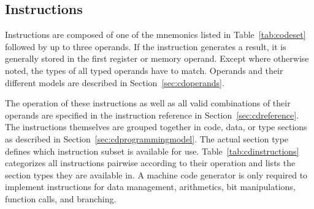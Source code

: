 \subsection{Instructions}

Instructions are composed of one of the mnemonics listed in Table~\ref{tab:codeset} followed by up to three operands.
If the instruction generates a result, it is generally stored in the first register or memory operand.
Except where otherwise noted, the types of all typed operands have to match.
Operands and their different models are described in Section~\ref{sec:cdoperands}.


The operation of these instructions as well as all valid combinations of their operands are specified in the instruction reference in Section~\ref{sec:cdreference}.
The instructions themselves are grouped together in code, data, or type sections as described in Section~\ref{sec:cdprogrammingmodel}.
The actual section type defines which instruction subset is available for use.
Table~\ref{tab:cdinstructions} categorizes all instructions pairwise according to their operation and lists the section types they are available in.
A machine code generator is only required to implement instructions for data management, arithmetics, bit manipulations, function calls, and branching.

\newcommand{\cdinstructionref}[3]{& #1 & \texttt{#2} & \ref{sec:cd#2} & \ifx#3\empty\else\texttt{#3} & \ref{sec:cd#3}\fi \\}

